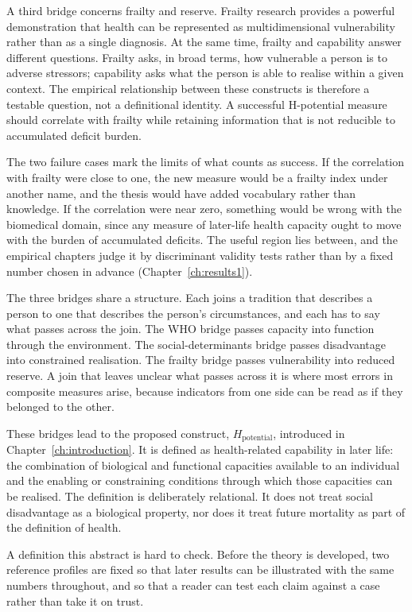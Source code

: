 A third bridge concerns frailty and reserve. Frailty research provides a powerful demonstration that health can be represented as multidimensional vulnerability rather than as a single diagnosis. At the same time, frailty and capability answer different questions. Frailty asks, in broad terms, how vulnerable a person is to adverse stressors; capability asks what the person is able to realise within a given context. The empirical relationship between these constructs is therefore a testable question, not a definitional identity. A successful H-potential measure should correlate with frailty while retaining information that is not reducible to accumulated deficit burden.

The two failure cases mark the limits of what counts as success. If the correlation with frailty were close to one, the new measure would be a frailty index under another name, and the thesis would have added vocabulary rather than knowledge. If the correlation were near zero, something would be wrong with the biomedical domain, since any measure of later-life health capacity ought to move with the burden of accumulated deficits. The useful region lies between, and the empirical chapters judge it by discriminant validity tests rather than by a fixed number chosen in advance (Chapter~\ref{ch:results1}).

The three bridges share a structure. Each joins a tradition that describes a person to one that describes the person's circumstances, and each has to say what passes across the join. The WHO bridge passes capacity into function through the environment. The social-determinants bridge passes disadvantage into constrained realisation. The frailty bridge passes vulnerability into reduced reserve. A join that leaves unclear what passes across it is where most errors in composite measures arise, because indicators from one side can be read as if they belonged to the other.

These bridges lead to the proposed construct, $H_{\text{potential}}$, introduced in Chapter~\ref{ch:introduction}. It is defined as health-related capability in later life: the combination of biological and functional capacities available to an individual and the enabling or constraining conditions through which those capacities can be realised. The definition is deliberately relational. It does not treat social disadvantage as a biological property, nor does it treat future mortality as part of the definition of health.

A definition this abstract is hard to check. Before the theory is developed, two reference profiles are fixed so that later results can be illustrated with the same numbers throughout, and so that a reader can test each claim against a case rather than take it on trust.

